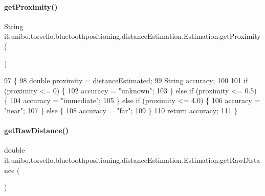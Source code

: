 \paragraph{\texorpdfstring{get\+Proximity()}{getProximity()}}
{\footnotesize\ttfamily String it.\+unibo.\+torsello.\+bluetoothpositioning.\+distance\+Estimation.\+Estimation.\+get\+Proximity (\begin{DoxyParamCaption}{ }\end{DoxyParamCaption})}


\begin{DoxyCode}
97                                  \{
98         \textcolor{keywordtype}{double} proximity = \hyperlink{classit_1_1unibo_1_1torsello_1_1bluetoothpositioning_1_1distanceEstimation_1_1Estimation_a7a5514b25ac6495842a53e54319be10d_a7a5514b25ac6495842a53e54319be10d}{distanceEstimated};
99         String accuracy;
100 
101         \textcolor{keywordflow}{if} (proximity <= 0) \{
102             accuracy = \textcolor{stringliteral}{"unknown"};
103         \} \textcolor{keywordflow}{else} \textcolor{keywordflow}{if} (proximity <= 0.5) \{
104             accuracy = \textcolor{stringliteral}{"immediate"};
105         \} \textcolor{keywordflow}{else} \textcolor{keywordflow}{if} (proximity <= 4.0) \{
106             accuracy = \textcolor{stringliteral}{"near"};
107         \} \textcolor{keywordflow}{else} \{
108             accuracy = \textcolor{stringliteral}{"far"};
109         \}
110         \textcolor{keywordflow}{return} accuracy;
111     \}
\end{DoxyCode}
\hypertarget{classit_1_1unibo_1_1torsello_1_1bluetoothpositioning_1_1distanceEstimation_1_1Estimation_ad355b2e850a8d6013ef771eecd740e1b_ad355b2e850a8d6013ef771eecd740e1b}{}\label{classit_1_1unibo_1_1torsello_1_1bluetoothpositioning_1_1distanceEstimation_1_1Estimation_ad355b2e850a8d6013ef771eecd740e1b_ad355b2e850a8d6013ef771eecd740e1b} 
\paragraph{\texorpdfstring{get\+Raw\+Distance()}{getRawDistance()}}
{\footnotesize\ttfamily double it.\+unibo.\+torsello.\+bluetoothpositioning.\+distance\+Estimation.\+Estimation.\+get\+Raw\+Distance (\begin{DoxyParamCaption}{ }\end{DoxyParamCaption})}


